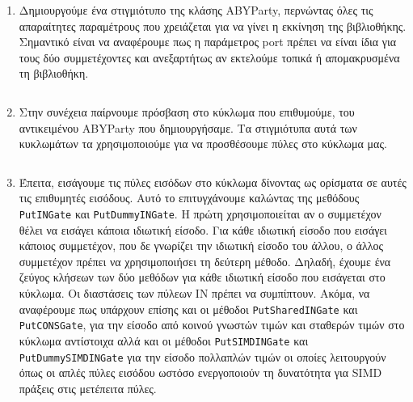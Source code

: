 \begin{enumerate}
    \item Δημιουργούμε ένα στιγμιότυπο της κλάσης ABYParty, περνώντας όλες τις απαραίτητες παραμέτρους που χρειάζεται για να γίνει η εκκίνηση της βιβλιοθήκης. Σημαντικό είναι να αναφέρουμε πως η παράμετρος port πρέπει να είναι ίδια για τους δύο συμμετέχοντες και ανεξαρτήτως αν εκτελούμε τοπικά ή απομακρυσμένα τη βιβλιοθήκη.
    \begin{longlisting}
        \begin{center}
            \inputminted[fontsize=\scriptsize,frame=single]{cpp}{./01_body/code/aby-example-step-1.cpp}
        \end{center}
    \end{longlisting}
    \item Στην συνέχεια παίρνουμε πρόσβαση στο κύκλωμα που επιθυμούμε, του αντικειμένου ABYParty που δημιουργήσαμε. Τα στιγμιότυπα αυτά των κυκλωμάτων τα χρησιμοποιούμε για να προσθέσουμε πύλες στο κύκλωμα μας.
    \begin{longlisting}
        \begin{center}
          \inputminted[fontsize=\scriptsize,frame=single]{cpp}{./01_body/code/aby-example-step-2.cpp}
        \end{center}
    \end{longlisting}
    \item Έπειτα, εισάγουμε τις πύλες εισόδων στο κύκλωμα δίνοντας ως ορίσματα σε αυτές τις επιθυμητές εισόδους. Αυτό το επιτυγχάνουμε καλώντας της μεθόδους \texttt{PutINGate} και \texttt{PutDummyINGate}. Η πρώτη χρησιμοποιείται αν ο συμμετέχον θέλει να εισάγει κάποια ιδιωτική είσοδο. Για κάθε ιδιωτική είσοδο που εισάγει κάποιος συμμετέχον, που δε γνωρίζει την ιδιωτική είσοδο του άλλου, ο άλλος συμμετέχον πρέπει να χρησιμοποιήσει τη δεύτερη μέθοδο. Δηλαδή, έχουμε ένα ζεύγος κλήσεων των δύο μεθόδων για κάθε ιδιωτική είσοδο που εισάγεται στο κύκλωμα. Οι διαστάσεις των πύλεων IN πρέπει να συμπίπτουν. Ακόμα, να αναφέρουμε πως υπάρχουν επίσης και οι μέθοδοι \texttt{PutSharedINGate} και \texttt{PutCONSGate}, για την είσοδο από κοινού γνωστών τιμών και σταθερών τιμών στο κύκλωμα αντίστοιχα αλλά και οι μέθοδοι \texttt{PutSIMDINGate} και \texttt{PutDummySIMDINGate} για την είσοδο πολλαπλών τιμών οι οποίες λειτουργούν όπως οι απλές πύλες εισόδου ωστόσο ενεργοποιούν τη δυνατότητα για SIMD πράξεις στις μετέπειτα πύλες.
    \begin{longlisting}
        \begin{center}

\end{center}
\end{longlisting}
\end{enumerate}
